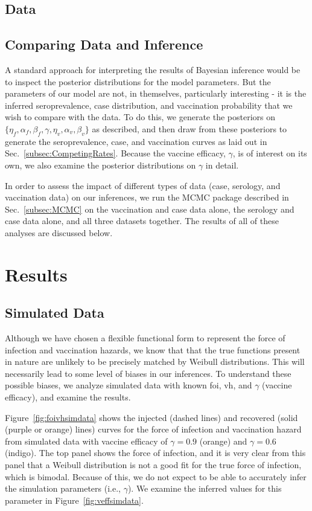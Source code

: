 \documentclass[nofootinbib,aps,pre,twocolumn,superscriptaddress,showkeys,showpacs]{revtex4-1}
\begin{document}
\subsection{Data \label{subsec:Data}}

\subsection{Comparing Data and Inference \label{subsec:Comp}}
A standard approach for interpreting the results of Bayesian inference would be to inspect the posterior distributions for the model parameters. But the parameters of our model are not, in themselves, particularly interesting - it is the inferred seroprevalence, case distribution, and vaccination probability that we wish to compare with the data. To do this, we generate the posteriors on $\{\eta_f, \alpha_f, \beta_f, \gamma, \eta_v, \alpha_v, \beta_v\}$ as described, and then draw from these posteriors to generate the seroprevalence, case, and vaccination curves as laid out in Sec.~\ref{subsec:CompetingRates}. Because the vaccine efficacy, $\gamma$, is of interest on its own, we also examine the posterior distributions on $\gamma$ in detail.

In order to assess the impact of different types of data (case, serology, and vaccination data) on our inferences, we run the MCMC package described in Sec.~\ref{subsec:MCMC} on the vaccination and case data alone, the serology and case data alone, and all three datasets together. The results of all of these analyses are discussed below.

\section{Results \label{sec:Results}}
\subsection{Simulated Data \label{subsec:SimDat}}
Although we have chosen a flexible functional form to represent the force of infection and vaccination hazards, we know that that the true functions present in nature are unlikely to be precisely matched by Weibull distributions. This will necessarily lead to some level of biases in our inferences. To understand these possible biases, we analyze simulated data with known foi, vh, and $\gamma$ (vaccine efficacy), and examine the results.  

Figure~\ref{fig:foivhsimdata} shows the injected (dashed lines) and recovered (solid (purple or orange) lines) curves for the force of infection and vaccination hazard from simulated data with vaccine efficacy of $\gamma = 0.9$ (orange) and $\gamma = 0.6$ (indigo). The top panel shows the force of infection, and it is very clear from this panel that a Weibull distribution is not a good fit for the true force of infection, which is bimodal.  Because of this, we do not expect to be able to accurately infer the simulation parameters (i.e., $\gamma$). We examine the inferred values for this parameter in Figure~\ref{fig:veffsimdata}.
\end{document}
